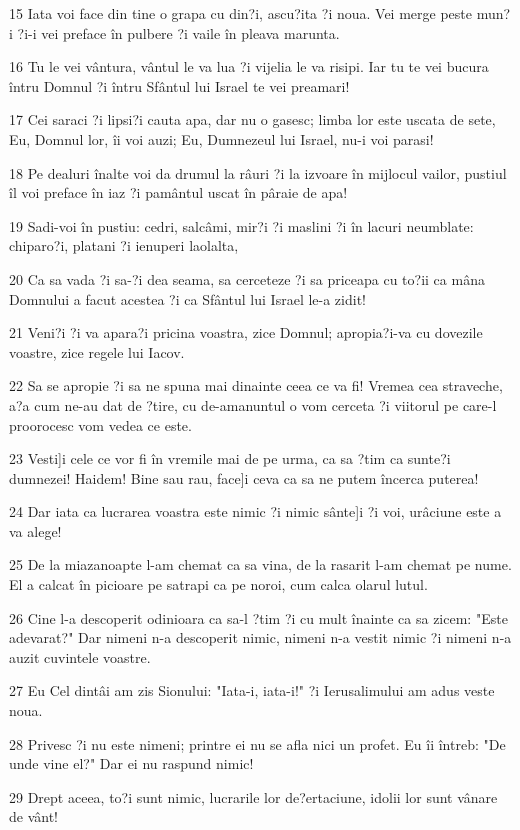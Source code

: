 \par 15 Iata voi face din tine o grapa cu din?i, ascu?ita ?i noua. Vei merge peste mun?i ?i-i vei preface în pulbere ?i vaile în pleava marunta.
\par 16 Tu le vei vântura, vântul le va lua ?i vijelia le va risipi. Iar tu te vei bucura întru Domnul ?i întru Sfântul lui Israel te vei preamari!
\par 17 Cei saraci ?i lipsi?i cauta apa, dar nu o gasesc; limba lor este uscata de sete, Eu, Domnul lor, îi voi auzi; Eu, Dumnezeul lui Israel, nu-i voi parasi!
\par 18 Pe dealuri înalte voi da drumul la râuri ?i la izvoare în mijlocul vailor, pustiul îl voi preface în iaz ?i pamântul uscat în pâraie de apa!
\par 19 Sadi-voi în pustiu: cedri, salcâmi, mir?i ?i maslini ?i în lacuri neumblate: chiparo?i, platani ?i ienuperi laolalta,
\par 20 Ca sa vada ?i sa-?i dea seama, sa cerceteze ?i sa priceapa cu to?ii ca mâna Domnului a facut acestea ?i ca Sfântul lui Israel le-a zidit!
\par 21 Veni?i ?i va apara?i pricina voastra, zice Domnul; apropia?i-va cu dovezile voastre, zice regele lui Iacov.
\par 22 Sa se apropie ?i sa ne spuna mai dinainte ceea ce va fi! Vremea cea straveche, a?a cum ne-au dat de ?tire, cu de-amanuntul o vom cerceta ?i viitorul pe care-l proorocesc vom vedea ce este.
\par 23 Vesti]i cele ce vor fi în vremile mai de pe urma, ca sa ?tim ca sunte?i dumnezei! Haidem! Bine sau rau, face]i ceva ca sa ne putem încerca puterea!
\par 24 Dar iata ca lucrarea voastra este nimic ?i nimic sânte]i ?i voi, urâciune este a va alege!
\par 25 De la miazanoapte l-am chemat ca sa vina, de la rasarit l-am chemat pe nume. El a calcat în picioare pe satrapi ca pe noroi, cum calca olarul lutul.
\par 26 Cine l-a descoperit odinioara ca sa-l ?tim ?i cu mult înainte ca sa zicem: "Este adevarat?" Dar nimeni n-a descoperit nimic, nimeni n-a vestit nimic ?i nimeni n-a auzit cuvintele voastre.
\par 27 Eu Cel dintâi am zis Sionului: "Iata-i, iata-i!" ?i Ierusalimului am adus veste noua.
\par 28 Privesc ?i nu este nimeni; printre ei nu se afla nici un profet. Eu îi întreb: "De unde vine el?" Dar ei nu raspund nimic!
\par 29 Drept aceea, to?i sunt nimic, lucrarile lor de?ertaciune, idolii lor sunt vânare de vânt!

